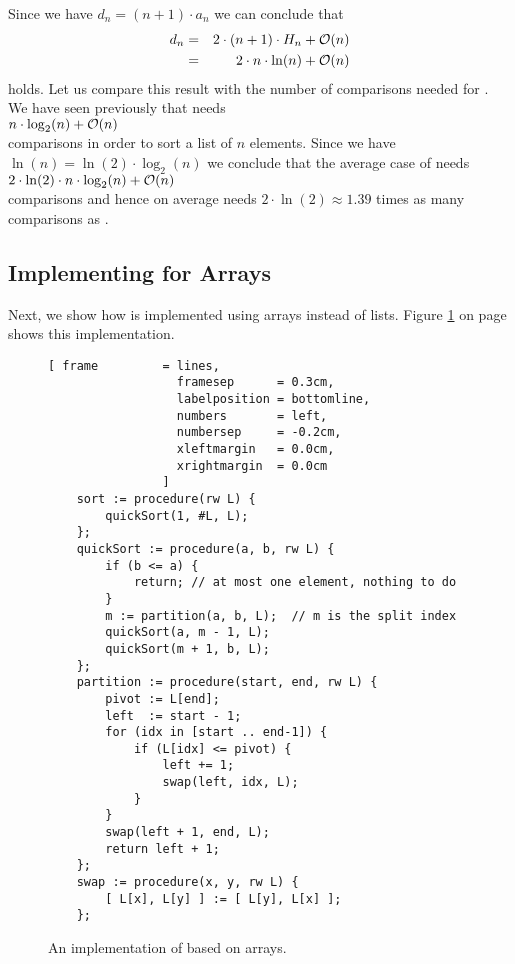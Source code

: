 Since we have $d_n = (n+1) \cdot a_{n}$ we can conclude that
\begin{eqnarray*}  
 d_n & = &  2 \cdot(n+1) \cdot H_n + \mathcal{O}(n) \\
     & = & 2 \cdot n \cdot \ln(n) + \mathcal{O}(n)
\end{eqnarray*}
holds.  Let us compare this result with the number of comparisons needed for .
We have seen previously that  needs
\\[0.2cm]
\hspace*{1.3cm} $n \cdot \log_2(n) + \mathcal{O}(n)$ \\[0.2cm]
comparisons in order to sort a list of $n$ elements.  Since we have $\ln(n) = \ln(2) \cdot \log_2(n)$
we conclude that the average case of  needs
 \\[0.2cm]
\hspace*{1.3cm} $2 \cdot \ln(2) \cdot n \cdot \log_2(n) + \mathcal{O}(n)$ \\[0.2cm]
comparisons and hence on average  needs  $2 \cdot \ln(2) \approx 1.39$ times as many comparisons as
.  


\subsection{Implementing  for Arrays}
Next, we show how   is implemented using arrays instead of lists.  Figure
\ref{fig:quick-sort-array.stlx} on page \pageref{fig:quick-sort-array.stlx} shows this implementation. 

\begin{figure}[!ht]
  \centering
\begin{Verbatim}[ frame         = lines, 
                  framesep      = 0.3cm, 
                  labelposition = bottomline,
                  numbers       = left,
                  numbersep     = -0.2cm,
                  xleftmargin   = 0.0cm,
                  xrightmargin  = 0.0cm
                ]
    sort := procedure(rw L) {
        quickSort(1, #L, L);
    };
    quickSort := procedure(a, b, rw L) {
        if (b <= a) {
            return; // at most one element, nothing to do
        }
        m := partition(a, b, L);  // m is the split index
        quickSort(a, m - 1, L);
        quickSort(m + 1, b, L);
    };
    partition := procedure(start, end, rw L) {
        pivot := L[end];
        left  := start - 1;
        for (idx in [start .. end-1]) {
            if (L[idx] <= pivot) {
                left += 1;
                swap(left, idx, L);
            }
        }
        swap(left + 1, end, L);
        return left + 1;
    };
    swap := procedure(x, y, rw L) {
        [ L[x], L[y] ] := [ L[y], L[x] ];
    };
\end{Verbatim}
\vspace*{-0.3cm}
  \caption{An implementation of  based on arrays.}
  \label{fig:quick-sort-array.stlx}
\end{figure}

